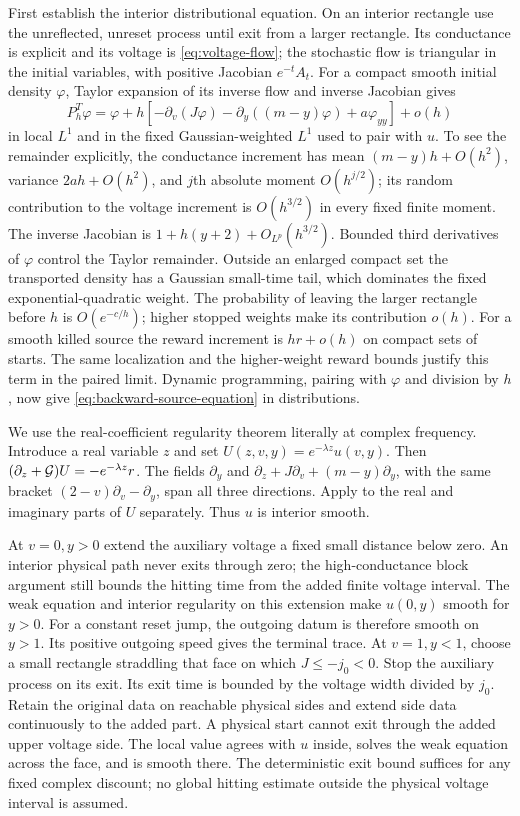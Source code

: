 First establish the interior distributional equation. On an interior
rectangle use the unreflected, unreset process until exit from a larger
rectangle. Its conductance is explicit and its voltage is
\eqref{eq:voltage-flow}; the stochastic flow is triangular in the
initial variables, with positive Jacobian $e^{-t}A_t$. For a compact
smooth initial density $\varphi$, Taylor expansion of its inverse flow
and inverse Jacobian gives
\begin{equation}\label{eq:local-transpose-expansion}
 P_h^T\varphi
  =\varphi+h[-\partial_v(J\varphi)
             -\partial_y((m-y)\varphi)+a\varphi_{yy}]+o(h)
\end{equation}
in local $L^1$ and in the fixed Gaussian-weighted $L^1$ used to pair
with $u$. To see the remainder explicitly, the conductance increment
has mean $(m-y)h+O(h^2)$, variance $2ah+O(h^2)$, and $j$th absolute
moment $O(h^{j/2})$; its random contribution to the voltage increment
is $O(h^{3/2})$ in every fixed finite moment. The inverse Jacobian
is $1+h(y+2)+O_{L^p}(h^{3/2})$. Bounded third derivatives of
$\varphi$ control the Taylor remainder. Outside an enlarged compact
set the transported density has a Gaussian small-time tail, which
dominates the fixed exponential-quadratic weight. The probability
of leaving the larger rectangle before $h$ is $O(e^{-c/h})$;
higher stopped weights make its contribution $o(h)$.
For a smooth killed source the reward increment is $hr+o(h)$ on
compact sets of starts. The same localization and the higher-weight
reward bounds justify this term in the paired limit.
Dynamic programming, pairing with $\varphi$ and division by $h$,
now give \eqref{eq:backward-source-equation} in distributions.

We use the real-coefficient regularity theorem literally at complex
frequency. Introduce a real variable $z$ and set
$U(z,v,y)=e^{-\lambda z}u(v,y)$. Then
$(\partial_z+\mathcal G)U=-e^{-\lambda z}r$.
The fields $\partial_y$ and
$\partial_z+J\partial_v+(m-y)\partial_y$, with the same bracket
$(2-v)\partial_v-\partial_y$, span all three directions.
Apply \cite[Theorem 1.1]{Hormander67} to the real and imaginary
parts of $U$ separately. Thus $u$ is interior smooth.

At $v=0,y>0$ extend the auxiliary voltage a fixed small distance
below zero. An interior physical path never exits through zero;
the high-conductance block argument still bounds the hitting
time from the added finite voltage interval. The weak equation
and interior regularity on this extension make $u(0,y)$ smooth
for $y>0$. For a constant reset jump, the outgoing datum is
therefore smooth on $y>1$. Its positive outgoing speed gives
the terminal trace. At $v=1,y<1$, choose a small rectangle
straddling that face on which $J\le-j_0<0$. Stop the auxiliary
process on its exit. Its exit time is bounded by the voltage
width divided by $j_0$. Retain the original data on reachable
physical sides and extend side data continuously to the added
part. A physical start cannot exit through the added upper
voltage side. The local value agrees with $u$ inside, solves
the weak equation across the face, and is smooth there.
The deterministic exit bound suffices for any fixed complex
discount; no global hitting estimate outside the physical
voltage interval is assumed.

